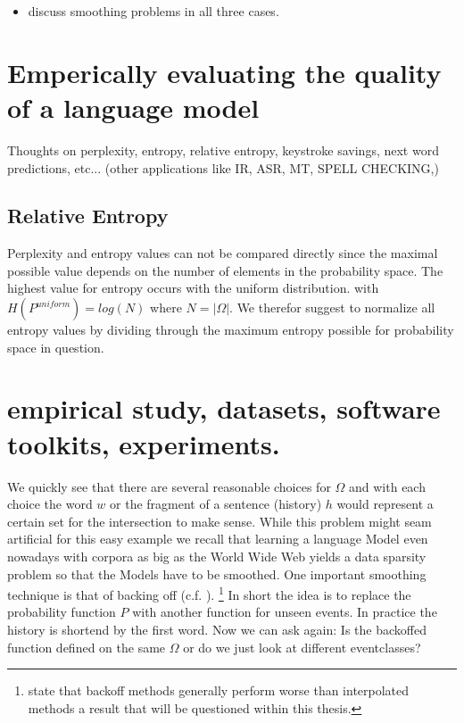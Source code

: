\documentclass[•]{book}
\begin{document}
\begin{itemize}
\item discuss smoothing problems in all three cases.
\end{itemize}

\chapter{Emperically evaluating the quality of a language model}
Thoughts on perplexity, entropy, relative entropy, keystroke savings, next word predictions, etc... (other applications like IR, ASR, MT, SPELL CHECKING,) 

\section{Relative Entropy}
Perplexity and entropy values can not be compared directly since the maximal possible value depends on the number of elements in the probability space.
The highest value for entropy occurs with the uniform distribution. with $H(P^{uniform})=log(N)$ where $N = |\Omega|$. 
We therefor suggest to normalize all entropy values by dividing through the maximum entropy possible for probability space in question. 

\chapter{empirical study, datasets, software toolkits, experiments.} 


We quickly see that there are several reasonable choices for $\Omega$ and with each choice the word $w$ or the fragment of a sentence (history) $h$ would represent a certain set for the intersection to make sense.
While this problem might seam artificial for this easy example we recall that learning a language Model even nowadays with corpora as big as the World Wide Web yields a data sparsity problem so that the Models have to be smoothed. 
One important smoothing technique is that of backing off (c.f. \cite{katz}\cite{kneser:ney:1994}). \footnote{\cite{chen:goodman} state that backoff methods generally perform worse than interpolated methods a result that will be questioned within this thesis.}
In short the idea is to replace the probability function $P$ with another function for unseen events. 
In practice the history is shortend by the first word. 
Now we can ask again: Is the backoffed function defined on the same $\Omega$ or do we just look at different eventclasses?
\end{document}
